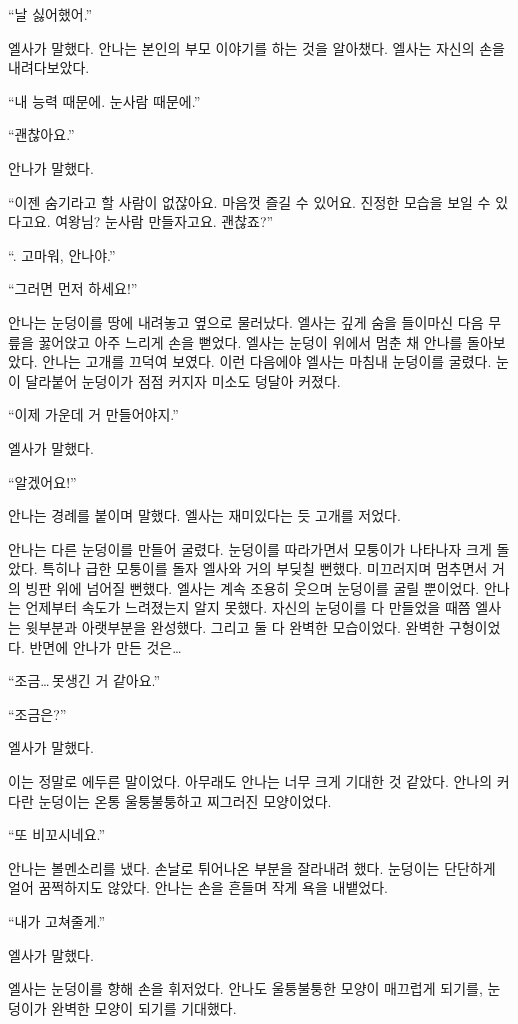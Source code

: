 ``날 싫어했어.''

엘사가 말했다. 안나는 본인의 부모 이야기를 하는 것을 알아챘다. 엘사는 자신의 손을 내려다보았다.

``내 능력 때문에. 눈사람 때문에.''

``괜찮아요.''

안나가 말했다.

``이젠 숨기라고 할 사람이 없잖아요. 마음껏 즐길 수 있어요. 진정한 모습을 보일 수 있다고요. 여왕님? 눈사람 만들자고요. 괜찮죠?''

``. 고마워, 안나야.''

``그러면 먼저 하세요!''

안나는 눈덩이를 땅에 내려놓고 옆으로 물러났다. 엘사는 깊게 숨을 들이마신 다음 무릎을 꿇어앉고 아주 느리게 손을 뻗었다. 엘사는 눈덩이 위에서 멈춘 채 안나를 돌아보았다. 안나는 고개를 끄덕여 보였다. 이런 다음에야 엘사는 마침내 눈덩이를 굴렸다. 눈이 달라붙어 눈덩이가 점점 커지자 미소도 덩달아 커졌다.

``이제 가운데 거 만들어야지.''

엘사가 말했다.

``알겠어요!''

안나는 경례를 붙이며 말했다. 엘사는 재미있다는 듯 고개를 저었다.

안나는 다른 눈덩이를 만들어 굴렸다. 눈덩이를 따라가면서 모퉁이가 나타나자 크게 돌았다. 특히나 급한 모퉁이를 돌자 엘사와 거의 부딪칠 뻔했다. 미끄러지며 멈추면서 거의 빙판 위에 넘어질 뻔했다. 엘사는 계속 조용히 웃으며 눈덩이를 굴릴 뿐이었다. 안나는 언제부터 속도가 느려졌는지 알지 못했다. 자신의 눈덩이를 다 만들었을 때쯤 엘사는 윗부분과 아랫부분을 완성했다. 그리고 둘 다 완벽한 모습이었다. 완벽한 구형이었다. 반면에 안나가 만든 것은\ldots

``조금\ldots\,못생긴 거 같아요.''

``조금은?''

엘사가 말했다.

이는 정말로 에두른 말이었다. 아무래도 안나는 너무 크게 기대한 것 같았다. 안나의 커다란 눈덩이는 온통 울퉁불퉁하고 찌그러진 모양이었다.

``또 비꼬시네요.''

안나는 볼멘소리를 냈다. 손날로 튀어나온 부분을 잘라내려 했다. 눈덩이는 단단하게 얼어 꿈쩍하지도 않았다. 안나는 손을 흔들며 작게 욕을 내뱉었다.

``내가 고쳐줄게.''

엘사가 말했다.

엘사는 눈덩이를 향해 손을 휘저었다. 안나도 울퉁불퉁한 모양이 매끄럽게 되기를, 눈덩이가 완벽한 모양이 되기를 기대했다.

